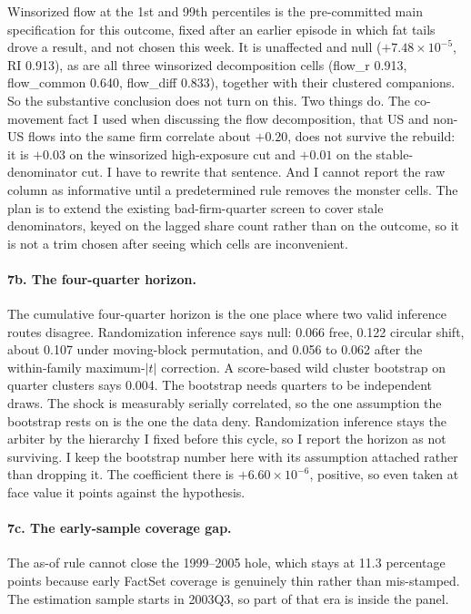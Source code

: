 \documentclass[11pt]{article}
\begin{document}
Winsorized flow at the 1st and 99th percentiles is the pre-committed main
specification for this outcome, fixed after an earlier episode in which fat
tails drove a result, and not chosen this week. It is unaffected and null
($+7.48 \times 10^{-5}$, RI 0.913), as are all three winsorized decomposition
cells (flow\_r 0.913, flow\_common 0.640, flow\_diff 0.833), together with
their clustered companions. So the substantive
conclusion does not turn on this. Two things do. The co-movement fact I used
when discussing the flow decomposition, that US and non-US flows into the same
firm correlate about $+0.20$, does not survive the rebuild: it is $+0.03$ on
the winsorized high-exposure cut and $+0.01$ on the stable-denominator cut.
I have to rewrite that sentence. And I cannot report the raw column as
informative until a predetermined rule removes the monster cells. The plan is
to extend the existing bad-firm-quarter screen to cover stale denominators,
keyed on the lagged share count rather than on the outcome, so it is not a trim
chosen after seeing which cells are inconvenient.

\paragraph{7b. The four-quarter horizon.} The cumulative four-quarter horizon is
the one place where two valid inference routes disagree. Randomization
inference says null: 0.066 free, 0.122 circular shift, about 0.107 under
moving-block permutation, and 0.056 to 0.062 after the within-family
maximum-$|t|$ correction. A score-based wild cluster bootstrap on quarter
clusters says 0.004. The bootstrap needs quarters to be independent draws. The
shock is measurably serially correlated, so the one assumption the bootstrap
rests on is the one the data deny. Randomization inference stays the arbiter by
the hierarchy I fixed before this cycle, so I report the horizon as not
surviving. I keep the bootstrap number here with its assumption attached rather
than dropping it. The coefficient there is $+6.60 \times 10^{-6}$, positive,
so even taken at face value it points against the hypothesis.

\paragraph{7c. The early-sample coverage gap.} The as-of rule cannot close the
1999--2005 hole, which stays at 11.3 percentage points because early FactSet
coverage is genuinely thin rather than mis-stamped. The estimation sample
starts in 2003Q3, so part of that era is inside the panel.
\end{document}

